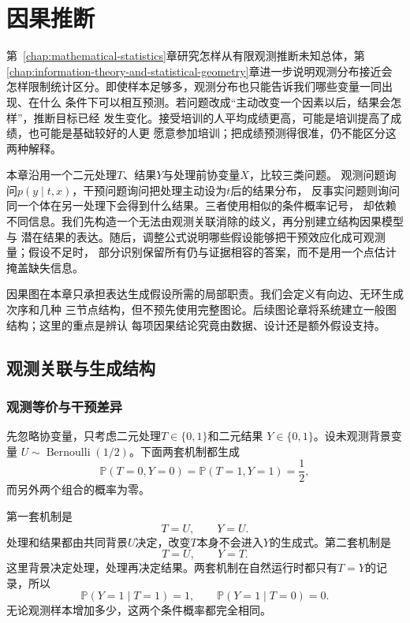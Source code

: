 \chapter{因果推断}
\label{chap:causal-inference}

第~\ref{chap:mathematical-statistics}章研究怎样从有限观测推断未知总体，第
\ref{chap:information-theory-and-statistical-geometry}章进一步说明观测分布接近会
怎样限制统计区分。即使样本足够多，观测分布也只能告诉我们哪些变量一同出现、在什么
条件下可以相互预测。若问题改成“主动改变一个因素以后，结果会怎样”，推断目标已经
发生变化。接受培训的人平均成绩更高，可能是培训提高了成绩，也可能是基础较好的人更
愿意参加培训；把成绩预测得很准，仍不能区分这两种解释。

本章沿用一个二元处理\(T\)、结果\(Y\)与处理前协变量\(X\)，比较三类问题。
观测问题询问\(p(y\mid t,x)\)，干预问题询问把处理主动设为\(t\)后的结果分布，
反事实问题则询问同一个体在另一处理下会得到什么结果。三者使用相似的条件概率记号，
却依赖不同信息。我们先构造一个无法由观测关联消除的歧义，再分别建立结构因果模型与
潜在结果的表达。随后，调整公式说明哪些假设能够把干预效应化成可观测量；假设不足时，
部分识别保留所有仍与证据相容的答案，而不是用一个点估计掩盖缺失信息。

因果图在本章只承担表达生成假设所需的局部职责。我们会定义有向边、无环生成次序和几种
三节点结构，但不预先使用完整图论。后续图论章将系统建立一般图结构；这里的重点是辨认
每项因果结论究竟由数据、设计还是额外假设支持。

\section{观测关联与生成结构}
\label{sec:causal-observation-generation}

\subsection{观测等价与干预差异}

先忽略协变量，只考虑二元处理\(T\in\{0,1\}\)和二元结果
\(Y\in\{0,1\}\)。设未观测背景变量
\(U\sim\operatorname{Bernoulli}(1/2)\)。下面两套机制都生成
\[
  \mathbb{P}(T=0,Y=0)
  =
  \mathbb{P}(T=1,Y=1)
  =
  \frac12,
\]
而另外两个组合的概率为零。

第一套机制是
\begin{equation}
  T=U,\qquad Y=U.
  \label{eq:causal-observational-equivalence-confounding}
\end{equation}
处理和结果都由共同背景\(U\)决定，改变\(T\)本身不会进入\(Y\)的生成式。第二套机制是
\begin{equation}
  T=U,\qquad Y=T.
  \label{eq:causal-observational-equivalence-effect}
\end{equation}
这里背景决定处理，处理再决定结果。两套机制在自然运行时都只有\(T=Y\)的记录，所以
\[
  \mathbb{P}(Y=1\mid T=1)=1,\qquad
  \mathbb{P}(Y=1\mid T=0)=0.
\]
无论观测样本增加多少，这两个条件概率都完全相同。

